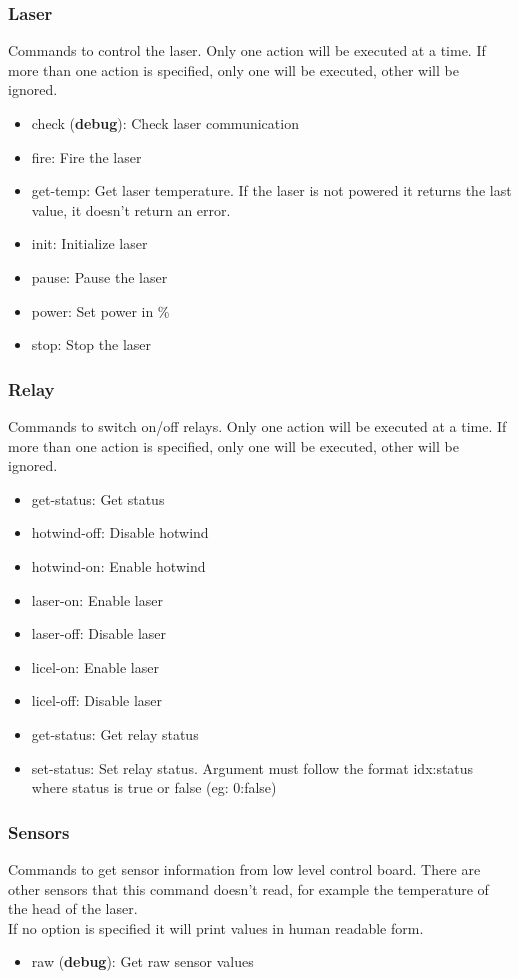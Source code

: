 \documentclass[letterpaper, 10 pt]{article}
\begin{document}
\subsubsection{Laser}
Commands to control the laser. Only one action will be executed at a time. If more than one action is specified, only one will be executed, other will be ignored.
\begin{itemize}
	\item check (\textbf{debug}): Check laser communication
	\item fire: Fire the laser
	\item get-temp: Get laser temperature. If the laser is not powered it returns the last value, it doesn't return an error.
	\item init: Initialize laser
	\item pause: Pause the laser
	\item power: Set power in \%
	\item stop: Stop the laser
\end{itemize}

\subsubsection{Relay}
Commands to switch on/off relays. Only one action will be executed at a time. If more than one action is specified, only one will be executed, other will be ignored.
\begin{itemize}
	\item get-status: Get status
	\item hotwind-off: Disable hotwind
	\item hotwind-on: Enable hotwind
	\item laser-on: Enable laser
	\item laser-off: Disable laser
	\item licel-on: Enable laser
	\item licel-off: Disable laser
	\item get-status: Get relay status
	\item set-status: Set relay status. Argument must follow the format idx:status where status is true or false (eg: 0:false)
\end{itemize}

\subsubsection{Sensors}
Commands to get sensor information from low level control board. There are other sensors that this command doesn't read, for example the temperature of the head of the laser.\\
If no option is specified it will print values in human readable form.
\begin{itemize}
	\item raw (\textbf{debug}): Get raw sensor values
\end{itemize}
\end{document}
